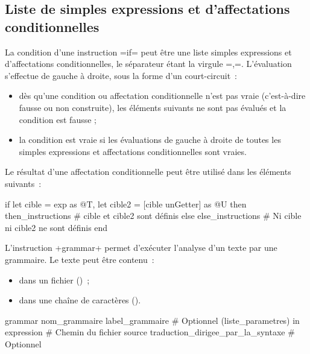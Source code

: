 \subsection{Liste de simples expressions et d'affectations conditionnelles}

La condition d'une instruction \ggsq=if= peut être une liste simples expressions et d'affectations conditionnelles, le séparateur étant la virgule \ggsq=,=. L'évaluation s'effectue de gauche à droite, sous la forme d'un court-circuit~:
\begin{itemize}
\item dès qu'une condition ou affectation conditionnelle n'est pas vraie (c'est-à-dire fausse ou non construite), les éléments suivants ne sont pas évalués et la condition est fausse ;
\item la condition est vraie si les évaluations de gauche à droite de toutes les simples expressions et affectations conditionnelles sont vraies.
\end{itemize}

Le résultat d'une affectation conditionnelle peut être utilisé dans les éléments suivants~:
\begin{galgas4}
if let cible = exp as @T, let cible2 = [cible unGetter] as @U then
  then_instructions # cible et cible2 sont définis
else
  else_instructions # Ni cible ni cible2 ne sont définis
end
\end{galgas4}








L'instruction \ggsq+grammar+ permet d'exécuter l'analyse d'un texte par une grammaire. Le texte peut être contenu~:
\begin{itemize}
  \item dans un fichier ()~;
  \item dans une chaîne de caractères ().
\end{itemize}











\begin{galgas4box}
grammar
  nom_grammaire
  label_grammaire # Optionnel
  (liste_parametres)
  in expression # Chemin du fichier source
  traduction_dirigee_par_la_syntaxe # Optionnel
\end{galgas4box}

